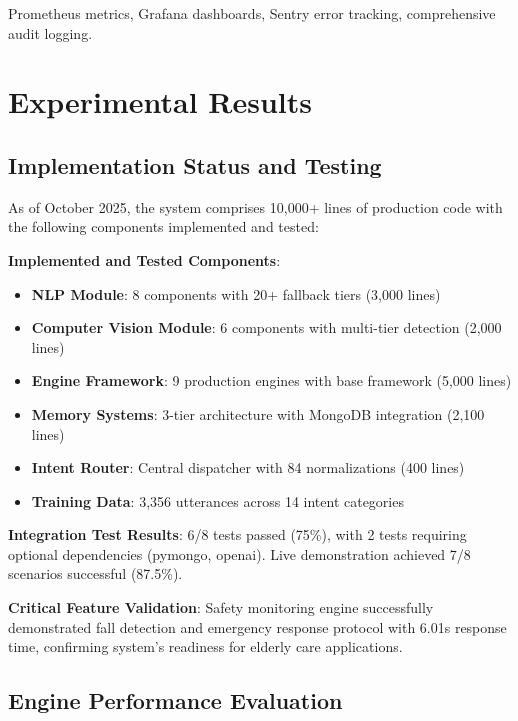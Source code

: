 \documentclass[conference]{IEEEtran}
\begin{document}
Prometheus metrics, Grafana dashboards, Sentry error tracking, comprehensive audit logging.

\section{Experimental Results}
\label{sec:experiments}

\subsection{Implementation Status and Testing}

As of October 2025, the system comprises 10,000+ lines of production code with the following components implemented and tested:

\textbf{Implemented and Tested Components}:
\begin{itemize}
    \item \textbf{NLP Module}: 8 components with 20+ fallback tiers (3,000 lines)
    \item \textbf{Computer Vision Module}: 6 components with multi-tier detection (2,000 lines)
    \item \textbf{Engine Framework}: 9 production engines with base framework (5,000 lines)
    \item \textbf{Memory Systems}: 3-tier architecture with MongoDB integration (2,100 lines)
    \item \textbf{Intent Router}: Central dispatcher with 84 normalizations (400 lines)
    \item \textbf{Training Data}: 3,356 utterances across 14 intent categories
\end{itemize}

\textbf{Integration Test Results}: 6/8 tests passed (75\%), with 2 tests requiring optional dependencies (pymongo, openai). Live demonstration achieved 7/8 scenarios successful (87.5\%).

\textbf{Critical Feature Validation}: Safety monitoring engine successfully demonstrated fall detection and emergency response protocol with 6.01s response time, confirming system's readiness for elderly care applications.

\subsection{Engine Performance Evaluation}
\end{document}
